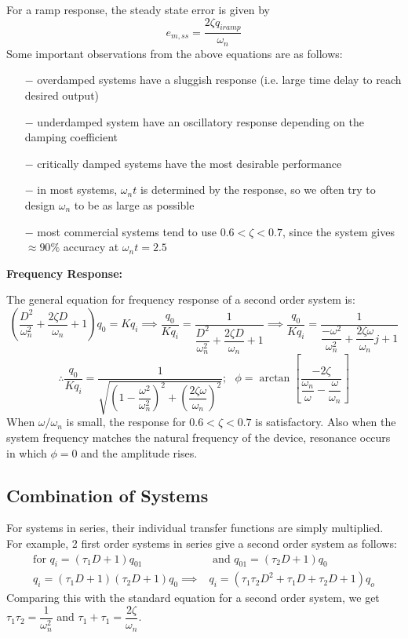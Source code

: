 \documentclass[11pt]{article}
\theoremstyle{definition}
\begin{document}
For a ramp response, the steady state error is given by $$e_{m,ss}=\frac{2\zeta q_{iramp}}{\omega_n}$$
Some important observations from the above equations are as follows:
\vspace{-3mm}
\begin{itemize}
	\itemsep-0.1em
	\item[$-$] overdamped systems have a sluggish response (i.e. large time delay to reach desired output)
	\item[$-$] underdamped system have an oscillatory response depending on the damping coefficient
	\item[$-$] critically damped systems have the most desirable performance
	\item[$-$] in most systems, $\omega_nt$ is determined by the response, so we often try to design $\omega_n$ to be as large as possible
	\item[$-$] most commercial systems tend to use $0.6<\zeta<0.7$, since the system gives $\approx 90\%$ accuracy at $\omega_nt=2.5$
\end{itemize}
\textbf{\large Frequency Response:}

The general equation for frequency response of a second order system is:
$$\left(\frac{D^2}{\omega_n^2}+\frac{2\zeta D}{\omega_n}+1\right)q_0=Kq_i\implies \frac{q_0}{Kq_i}=\frac{1}{\dfrac{D^2}{\omega_n^2}+\dfrac{2\zeta D}{\omega_n}+1}\implies \frac{q_0}{Kq_i}=\frac{1}{\dfrac{-\omega^2}{\omega_n^2}+\dfrac{2\zeta\omega}{\omega_n}j+1}$$
$$\therefore \frac{q_0}{Kq_i}=\frac{1}{\sqrt{\left(1-\dfrac{\omega^2}{\omega_n^2}\right)^2+\left(\dfrac{2\zeta\omega}{\omega_n}\right)^2}};\text{ }\phi=\arctan\left[\frac{-2\zeta}{\dfrac{\omega_n}{\omega}-\dfrac{\omega}{\omega_n}}\right]$$
When $\omega/\omega_n$ is small, the response for $0.6<\zeta<0.7$ is satisfactory. Also when the system frequency matches the natural frequency of the device, resonance occurs in which $\phi=0$ and the amplitude rises.
\subsection{Combination of Systems}
For systems in series, their individual transfer functions are simply multiplied. For example, 2 first order systems in series give a second order system as follows:
\begin{align*}
	\text{for }q_i=(\tau_1D+1)q_{01}&\text{ and }q_{01}=(\tau_2D+1)q_0\\
	 q_i=(\tau_1D+1)(\tau_2D+1)q_0\implies & q_i=(\tau_1\tau_2D^2+\tau_1D+\tau_2D+1)q_o
\end{align*}
Comparing this with the standard equation for a second order system, we get $\tau_1\tau_2=\dfrac{1}{\omega_n^2}$ and $\tau_1+\tau_1=\dfrac{2\zeta}{\omega_n}$.
\end{document}
